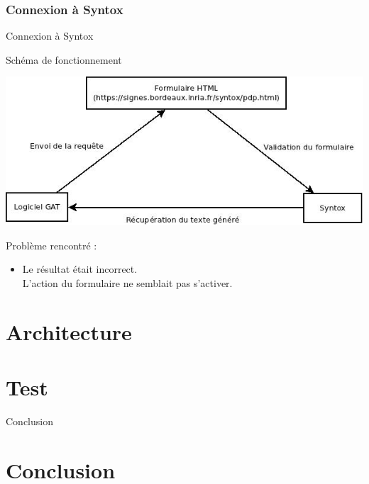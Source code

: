 \documentclass[8pt]{beamer}
\begin{document}
\subsubsection{Connexion à Syntox}
\begin{frame}{Connexion à Syntox}
\begin{block}{Schéma de fonctionnement}
\begin{center}
\includegraphics[scale=0.35]{syntox_connection.jpg}
\end{center}
Problème rencontré :
\begin{itemize}
\item Le résultat était incorrect.  \\
L'action du formulaire ne semblait pas s'activer.
\end{itemize}
\end{block}
\end{frame}



\section{Architecture}



\section{Test}
\begin{frame}
\end{frame}


\begin{frame}{Conclusion}
\section*{Conclusion}
\end{frame}
\end{document}
